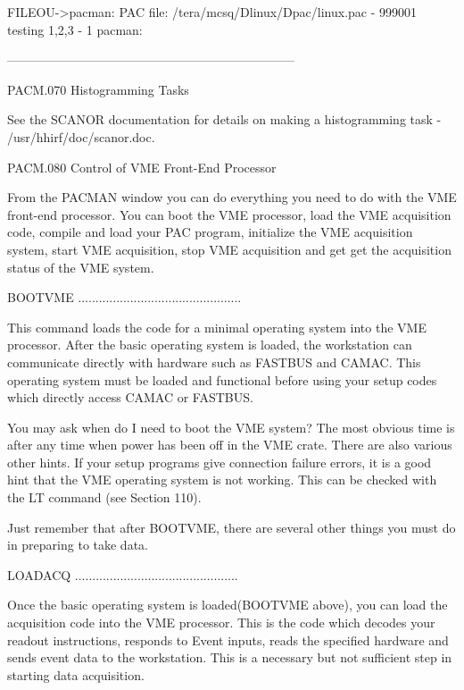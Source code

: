    FILEOU->pacman:  PAC file: /tera/mcsq/Dlinux/Dpac/linux.pac   -       999001
     testing 1,2,3                                               -            1
   pacman:
 
     ---------------------------------------------------------------------
 
 
   PACM.070 Histogramming Tasks
 
   See  the  SCANOR documentation for details on making a histogramming task -
   /usr/hhirf/doc/scanor.doc.
 
 
   PACM.080 Control of VME Front-End Processor
 
   From the PACMAN window you can do everything you need to do  with  the  VME
   front-end  processor.  You  can  boot  the  VME  processor,  load  the  VME
   acquisition code, compile and load your PAC  program,  initialize  the  VME
   acquisition  system,  start  VME  acquisition, stop VME acquisition and get
   get the acquisition status of the VME system.
 
   BOOTVME ...............................................
 
   This command loads the code for a minimal operating  system  into  the  VME
   processor.  After the basic operating system is loaded, the workstation can
   communicate  directly  with  hardware  such  as  FASTBUS  and  CAMAC.  This
   operating  system  must  be  loaded  and functional before using your setup
   codes which directly access CAMAC or FASTBUS.
 
   You may ask when do I need to boot the VME system? The  most  obvious  time
   is  after any time when power has been off in the VME crate. There are also
   various other  hints.  If  your  setup  programs  give  connection  failure
   errors,  it  is  a  good hint that the VME operating system is not working.
   This can be checked with the LT command (see Section 110).
 
   Just remember that after BOOTVME, there are several other things  you  must
   do in preparing to take data.
 
   LOADACQ ...............................................
 
   Once  the basic operating system is loaded(BOOTVME above), you can load the
   acquisition code into the VME processor. This is  the  code  which  decodes
   your  readout  instructions,  responds to Event inputs, reads the specified
   hardware and sends event data to the workstation. This is a  necessary  but
   not sufficient step in starting data acquisition.
 
